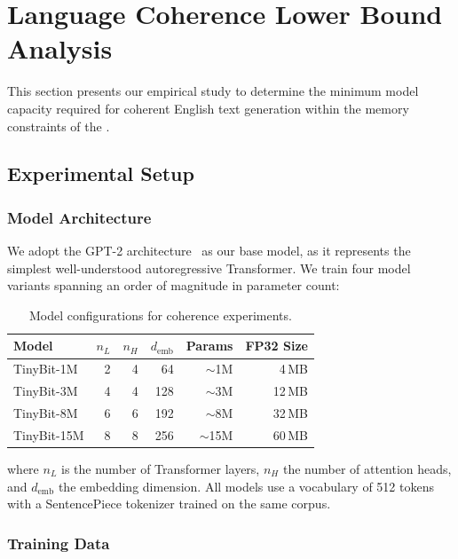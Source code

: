 \section{Language Coherence Lower Bound Analysis}
\label{sec:coherence}

This section presents our empirical study to determine the minimum model
capacity required for coherent English text generation within the memory
constraints of the \espss{}.

\subsection{Experimental Setup}

\subsubsection{Model Architecture}

We adopt the GPT-2 architecture~\cite{radford2019language} as our base model,
as it represents the simplest well-understood autoregressive Transformer. We
train four model variants spanning an order of magnitude in parameter count:

\begin{table}[H]
\centering
\caption{Model configurations for coherence experiments.}
\label{tab:model_configs}
\small
\begin{tabular}{lrrrrr}
\toprule
\textbf{Model} & $n_L$ & $n_H$ & $d_\text{emb}$ & \textbf{Params} & \textbf{FP32 Size} \\
\midrule
TinyBit-1M  & 2 & 4 & 64  & $\sim$1M  & 4\,MB \\
TinyBit-3M  & 4 & 4 & 128 & $\sim$3M  & 12\,MB \\
TinyBit-8M  & 6 & 6 & 192 & $\sim$8M  & 32\,MB \\
TinyBit-15M & 8 & 8 & 256 & $\sim$15M & 60\,MB \\
\bottomrule
\end{tabular}
\end{table}

\noindent where $n_L$ is the number of Transformer layers, $n_H$ the number
of attention heads, and $d_\text{emb}$ the embedding dimension. All models use
a vocabulary of 512 tokens with a SentencePiece tokenizer trained on the same
corpus.

\subsubsection{Training Data}

